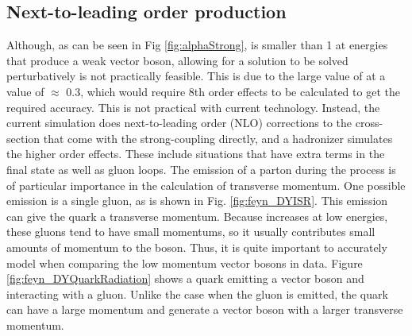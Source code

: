 \subsection{Next-to-leading order production}
Although, as can be seen in Fig \ref{fig:alphaStrong}, \alphastrong is smaller than 1 at energies that produce a weak vector boson, allowing for a solution to be solved perturbatively is not practically feasible. This is due to the large value of \alphastrong at a value of $\approx$ 0.3, which would require 8th order effects to be calculated to get the required accuracy. This is not practical with current technology. Instead, the current simulation does next-to-leading order (NLO) corrections to the cross-section that come with the strong-coupling directly, and a hadronizer simulates the higher order effects. These include situations that have extra terms in the final state as well as gluon loops.
The emission of a parton during the process is of particular importance in the calculation of transverse momentum. One possible emission is a single gluon, as is shown in Fig. \ref{fig:feyn_DYISR}. This emission can give the quark a transverse momentum. Because \alphastrong increases at low energies, these gluons tend to have small momentums, so it usually contributes small amounts of momentum to the boson. Thus, it is quite important to accurately model when comparing the low momentum vector bosons in data. Figure \ref{fig:feyn_DYQuarkRadiation} shows a quark emitting a vector boson and interacting with a gluon. Unlike the case when the gluon is emitted, the quark can have a large momentum and generate a vector boson with a larger transverse momentum. 




